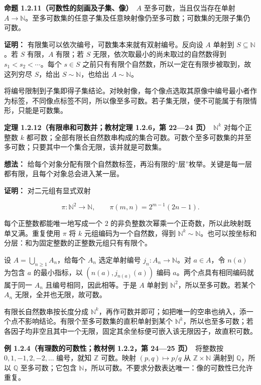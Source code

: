 \documentclass[11pt,a4paper]{article}
\begin{document}
\textbf{命题 1.2.11（可数性的刻画及子集、像）}　\(A\)
至多可数，当且仅当存在单射
\(A\to\mathbb N\)。至多可数集的任意子集及任意映射像仍至多可数；可数集的无限子集仍可数。

\textbf{证明：} 有限集可以依次编号，可数集本来就有双射编号。反向设 \(A\)
单射到 \(S\subseteq\mathbb N\)。若 \(S\) 有限，\(A\) 有限；若 \(S\)
无限，依次取最小的尚未取过的自然数得到 \(s_1<s_2<\cdots\)。每个
\(s\in S\) 之前只有有限个自然数，所以一定在有限步被取到，故这列穷尽
\(S\)，给出 \(S\sim\mathbb N\)，也给出 \(A\sim\mathbb N\)。

将编号限制到子集即得子集结论。对映射像，每个像点选取其原像中编号最小者作为标签，不同像点标签不同，所以像至多可数。若子集无限，便不可能属于有限情形，只能是可数集。

\textbf{定理 1.2.12（有限串和可数并；教材定理 1.2.6，第 22---24
页）}　\(\mathbb N^k\) 对每个正整数 \(k\)
都可数；全部有限长自然数串构成的集合可数。可数个至多可数集的并至多可数；只要其中一个集合无限，该并就是可数集。

\textbf{想法：}
给每个对象分配有限个自然数标签，再沿有限的``层''枚举。关键是每一层都有限，且每个对象总会进入某一层。

\textbf{证明：} 对二元组有显式双射

\begin{equation*}
\pi:\mathbb N^2\longrightarrow\mathbb N,\qquad
\pi(m,n)=2^{m-1}(2n-1).
\tag{1.2.13}
\end{equation*}

每个正整数都能唯一地写成一个 \(2\)
的非负整数次幂乘一个正奇数，所以此映射既单又满。重复使用 \(\pi\) 将
\(k\) 元组编码为一个自然数，得到
\(\mathbb N^k\sim\mathbb N\)。也可以按坐标和分层：和为固定整数的正整数元组只有有限个。

设 \(A=\bigcup_{n\ge1}A_n\)，给每个 \(A_n\) 选定单射编号
\(j_n:A_n\to\mathbb N\)。对 \(a\in A\)，令 \(n(a)\) 为包含 \(a\)
的最小指标，以 \((n(a),j_{n(a)}(a))\) 编码
\(a\)。两个点具有相同编码就属于同一 \(A_n\) 且编号相同，因此相等。于是
\(A\) 单射到 \(\mathbb N^2\)，所以至多可数。若某个 \(A_n\)
无限，全并也无限，故可数。

有限长自然数串按长度分成
\(\mathbb N^k\)，再作可数并即可；如把唯一的空串也纳入，添一个点不影响结论。有限个至多可数集的直积单射到某个
\(\mathbb N^k\)，所以也至多可数；若各因子均非空且其中一个无限，固定其余坐标便可嵌入该无限因子，故直积可数。

\textbf{例 1.2.4（有理数的可数性；教材例 1.2.2，第 24---25
页）}　将整数按 \(0,1,-1,2,-2,\ldots\) 编号，就知 \(\mathbb Z\)
可数。映射 \((p,q)\mapsto p/q\) 从 \(\mathbb Z\times\mathbb N\) 满射到
\(\mathbb Q\)，所以 \(\mathbb Q\) 至多可数；它包含
\(\mathbb N\)，所以可数。不要求分数表达唯一：像的可数性已允许重复。
\end{document}
